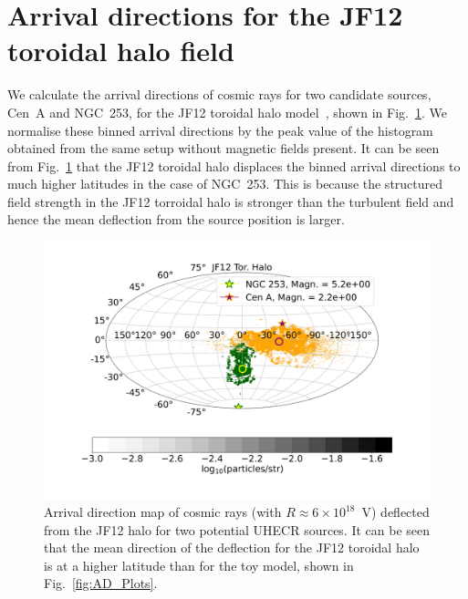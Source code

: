 \documentclass[usenatbib]{mnras}
\begin{document}

\section{Arrival directions for the JF12 toroidal halo field}
\label{Appendix_D}
We calculate the arrival directions of cosmic rays for two candidate sources, Cen~A and NGC~253, for the JF12 toroidal halo model~\citep{JF12}, shown in Fig.~\ref{JF12_AD}. We normalise these binned arrival directions by the peak value of the histogram obtained from the same setup without magnetic fields present. It can be seen from Fig.~\ref{JF12_AD} that the JF12 toroidal halo displaces the binned arrival directions to much higher latitudes in the case of NGC~253. This is because the structured field strength in the JF12 torroidal halo is stronger than the turbulent field and hence the mean deflection from the source position is larger.
\begin{figure}
\centering
\includegraphics[width=0.60\linewidth]{Images/AD_30kpc/New_Bins_180_CenA_NGC253_JF12_Halo_40_EeV.png}
 \caption{Arrival direction map of cosmic rays (with $R \approx 6 \times 10^{18}$~V) deflected from the JF12 halo for two potential UHECR sources. It can be seen that the mean direction of the deflection for the JF12 toroidal halo is at a higher latitude than for the toy model, shown in Fig.~\ref{fig:AD_Plots}.}
\label{JF12_AD}
\end{figure}
\end{document}
